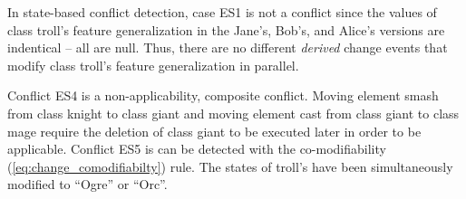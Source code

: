 In state-based conflict detection, case ES1 is not a conflict since the values of class \textsf{troll}'s feature \textsf{generalization} in the Jane's, Bob's, and Alice's versions are indentical -- all are null. Thus, there are no different \textit{derived} change events that modify class \textsf{troll}'s feature \textsf{generalization} in parallel. 

Conflict ES4 is a non-applicability, composite conflict. Moving element \textsf{smash} from class \textsf{knight} to class \textsf{giant} and moving element \textsf{cast} from class \textsf{giant} to class \textsf{mage} require the deletion of class \textsf{giant} to be executed later in order to be applicable. Conflict ES5 is can be detected with the co-modifiability  (\ref{eq:change_comodifiabilty}) rule. The states of \textsf{troll}'s  have been simultaneously modified to ``Ogre'' or ``Orc''.

